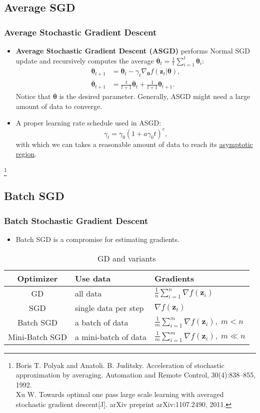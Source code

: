 \documentclass[10pt]{beamer}
\theoremstyle{mystyle}
\def\bb#1{\mathbf{#1}}
\newcommand{\bst}{\boldsymbol\theta}
\newcommand\blfootnote[1]{%
  \begingroup
  \renewcommand\thefootnote{}\footnote[frame]{#1}%
  \addtocounter{footnote}{-1}%
  \endgroup
}
\theoremstyle{mystyle}
\begin{document}
\subsection{Average SGD}
\begin{frame}
	\frametitle{Average Stochastic Gradient Descent}
	\begin{itemize}
		\item {\bf Average Stochastic Gradient Descent (ASGD)} performs Normal SGD update and recursively computes the average $\overline{\bst}_t=\frac1{t}\sum_{i=1}^t\bst_i$:
		\begin{align}
			\bst_{t+1} &= \bst_t-\gamma_t\nabla_{\bst}f(\bb z_t\vert\bst), \\
			\overline{\bst}_{t+1} &= \frac{t}{t+1}\overline{\bst}_t + \frac1{t+1}\bst_{t+1}.
		\end{align}
		Notice that $\overline{\bst}$ is the desired parameter. Generally, ASGD might need a large amount of data to converge.
		\item A proper learning rate schedule used in ASGD: $$\gamma_t=\gamma_0(1+a\gamma_0t)^c,$$ with which we can takes a reasonable amount of data to reach its \href{https://en.wikipedia.org/wiki/Asymptotic_analysis}{asymptotic region}.
	\end{itemize}
	\blfootnote{Boris T. Polyak and Anatoli. B. Juditsky. Acceleration of stochastic approximation by averaging.
	Automation and Remote Control, 30(4):838–855, 1992.\\Xu W. Towards optimal one pass large scale learning with averaged stochastic gradient descent[J]. arXiv preprint arXiv:1107.2490, 2011.}
\end{frame}

\subsection{Batch SGD}
\begin{frame}
	\frametitle{Batch Stochastic Gradient Descent}
	\begin{itemize}
		\item Batch SGD is a compromise for estimating gradients.
	\end{itemize}
	\begin{table}
		{\renewcommand\arraystretch{1.4}
		\begin{tabular}{cll}
			\hline
			\bf Optimizer & \bf Use data & \bf Gradients \\ \hline
			GD & all data & $\frac1{n}\sum_{i=1}^n\nabla f(\bb z_i)$ \\
			SGD & single data per step & $\nabla f(\bb z_t)$ \\
			Batch SGD & a batch of data & $\frac1{m}\sum_{i=1}^m\nabla f(\bb z_i),\;m < n$ \\
			Mini-Batch SGD & a mini-batch of data & $\frac1{m}\sum_{i=1}^m\nabla f(\bb z_i),\;m\ll n$ \\ \hline
		\end{tabular}}
		\caption{GD and variants}
	\end{table}
\end{frame}
\end{document}
